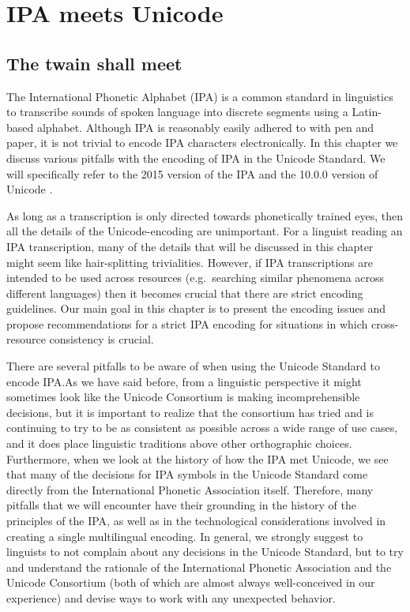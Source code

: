 \chapter{IPA meets Unicode}
\label{ipa-meets-unicode}

\section{The twain shall meet}

The International Phonetic Alphabet (IPA) is a common standard in linguistics to
transcribe sounds of spoken language into discrete segments using a Latin-based
alphabet. Although IPA is reasonably easily adhered to with pen and paper, it is
not trivial to encode IPA characters electronically. In this chapter we discuss
various pitfalls with the encoding of IPA in the Unicode Standard. We will
specifically refer to the 2015 version of the IPA \citep{IPA2015} and the 10.0.0 version of Unicode \citep{Unicode2017}.

As long as a transcription is only directed towards phonetically trained eyes,
then all the details of the Unicode-encoding are unimportant. For a linguist
reading an IPA transcription, many of the details that will be discussed in this
chapter might seem like hair-splitting trivialities. However, if IPA
transcriptions are intended to be used across resources (e.g.~searching similar
phenomena across different languages) then it becomes crucial that there are
strict encoding guidelines. Our main goal in this chapter is to present the
encoding issues and propose recommendations for a strict IPA encoding for
situations in which cross-resource consistency is crucial.

There are several pitfalls to be aware of when using the Unicode Standard to
encode IPA.\@ As we have said before, from a linguistic perspective it might
sometimes look like the Unicode Consortium is making incomprehensible decisions,
but it is important to realize that the consortium has tried and is continuing
to try to be as consistent as possible across a wide range of use cases, and it
does place linguistic traditions above other orthographic choices. Furthermore,
when we look at the history of how the IPA met Unicode, we see that many of the
decisions for IPA symbols in the Unicode Standard come directly from the
International Phonetic Association itself. Therefore, many pitfalls that we will
encounter have their grounding in the history of the principles of the IPA, as
well as in the technological considerations involved in creating a single
multilingual encoding. In general, we strongly suggest to linguists to not
complain about any decisions in the Unicode Standard, but to try and understand
the rationale of the International Phonetic Association and the Unicode
Consortium (both of which are almost always well-conceived in our experience)
and devise ways to work with any unexpected behavior.

